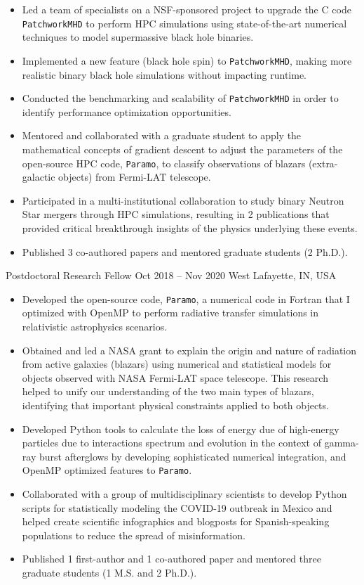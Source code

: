 {%
\begin{itemize}
    \item Led a team of specialists on a NSF-sponsored project to upgrade the C code \texttt{PatchworkMHD} to perform HPC simulations using state-of-the-art numerical techniques to model supermassive black hole binaries.
    \item Implemented a new feature (black hole spin) to \texttt{PatchworkMHD}, making more realistic binary black hole simulations without impacting runtime.
    \item Conducted the benchmarking and scalability of \texttt{PatchworkMHD} in order to identify performance optimization opportunities.
    \item Mentored and collaborated with a graduate student to apply the mathematical concepts of gradient descent to adjust the parameters of the open-source HPC code, \texttt{Paramo}, to classify observations of blazars (extra-galactic objects) from Fermi-LAT telescope.
    \item Participated in a multi-institutional collaboration to study binary Neutron Star mergers through HPC simulations, resulting in 2 publications that provided critical breakthrough insights of the physics underlying these events.
    \item Published 3 co-authored papers and mentored graduate students (2 Ph.D.).
\end{itemize}
}
\cventry{}%
{\Purdue}%
{Postdoctoral Research Fellow}%
{Oct 2018 -- Nov 2020}%
{West Lafayette, IN, USA}%
{%
\begin{itemize}
    \item Developed the open-source code, \texttt{Paramo}, a numerical code in Fortran that I optimized with OpenMP to perform radiative transfer simulations in relativistic astrophysics scenarios.
    \item Obtained and led a NASA grant to explain the origin and nature of radiation from active galaxies (blazars) using  numerical and statistical models for objects observed with NASA Fermi-LAT space telescope. This research helped to unify our understanding of the two main types of blazars, identifying that important physical constraints applied to both objects.
    \item Developed Python tools to calculate the loss of energy due of high-energy particles due to interactions spectrum and evolution in the context of gamma-ray burst afterglows by developing sophisticated numerical integration, and OpenMP optimized features to \texttt{Paramo}.
    \item Collaborated with a group of multidisciplinary scientists to develop Python scripts for statistically modeling the COVID-19 outbreak in Mexico and helped create scientific infographics and blogposts for Spanish-speaking populations to reduce the spread of misinformation.
    \item Published 1 first-author and 1 co-authored paper and mentored three graduate students (1 M.S. and 2 Ph.D.).
\end{itemize}
}
